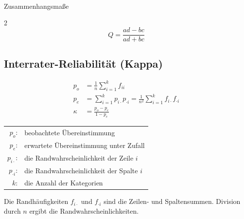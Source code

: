 \begin{formulaBox}{Zusammenhangsmaße}{}
\begin{multicols}{2}
$$Q = \frac{ad-bc}{ad+bc}$$

\subsection*{Interrater-Reliabilität (Kappa)}

\begin{align*}
  p_o &= \frac{1}{n}\sum_{i=1}^k f_{ii}\\
  p_e &= \sum_{i=1}^k p_{i\cdot}p_{\cdot i}
  = \frac{1}{n^2}\sum_{i=1}^k f_{i\cdot}f_{\cdot i}\\
  \kappa &= \frac{p_o - p_e}{1 - p_e}
\end{align*}

\begin{tabular}{rl}
  $p_o$:&beobachtete Übereinstimmung\\
  $p_e$:&erwartete Übereinstimmung unter Zufall\\
  $p_{i\cdot}$:&die Randwahrscheinlichkeit der Zeile $i$\\
  $p_{\cdot i}$:&die Randwahrscheinlichkeit der Spalte $i$\\
  $k$:&die Anzahl der Kategorien
\end{tabular}

\par\smallskip
Die Randhäufigkeiten $f_{i\cdot}$ und $f_{\cdot i}$ sind die Zeilen- und Spaltensummen. Division durch $n$ ergibt die Randwahrscheinlichkeiten.

\end{multicols}

\end{formulaBox}
